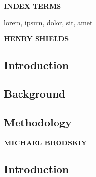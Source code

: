 \documentclass[conference]{IEEEtran}
\begin{document}

\begin{center}
\LARGE \textbf{INDEX TERMS}\\
\end{center}
\begin{justify}
  lorem, ipsum, dolor, sit, amet
\end{justify}

\newpage

\Large

\tableofcontents

\newpage



\Large

\listoftables


\listoffigures

\twocolumn


\newpage


\vspace{10pt} \LARGE \textbf{HENRY SHIELDS} \normalsize

\subsection{Introduction}

\lipsum[2-4]

\subsection{Background}

\lipsum[5-7]

\subsection{Methodology}

\lipsum[8-10]


\vspace{10pt} \LARGE \textbf{MICHAEL BRODSKIY} \normalsize

\subsection{Introduction}
\end{document}
